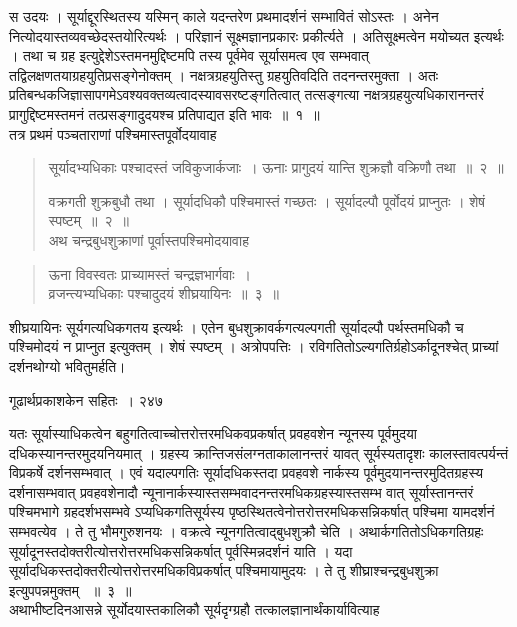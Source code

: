 \documentclass[11pt, openany]{book}
\begin{document}
\noindent स उदयः । सूर्याद्दूरस्थितस्य यस्मिन् काले यदन्तरेण प्रथमादर्शनं सम्भावितं सोऽस्तः । अनेन नित्योदयास्तव्यवच्छेदस्तयोरित्यर्थः । परिज्ञानं सूक्ष्मज्ञानप्रकारः प्रकीर्त्यते । अतिसूक्ष्मत्वेन मयोच्यत इत्यर्थः । तथा च ग्रह इत्युद्देशेऽस्तमनमुद्दिष्टमपि तस्य पूर्वमेव सूर्यासमत्व एव सम्भवात् तद्विलक्षणतयाग्रहयुतिप्रसङ्गेनोक्तम् । नक्षत्रग्रहयुतिस्तु ग्रहयुतिवदिति तदनन्तरमुक्ता । अतः प्रतिबन्धकजिज्ञासापगमेऽवश्यवक्तव्यत्वादस्यावसरष्टङ्गतित्वात् तत्सङ्गत्या नक्षत्रग्रहयुत्यधिकारानन्तरं प्रागुद्दिष्टमस्तमनं तत्प्रसङ्गादुदयश्च प्रतिपाद्यत इति भावः~॥~१~॥\\
\noindent तत्र प्रथमं पञ्चताराणां पश्चिमास्तपूर्वोदयावाह  \textendash


\begin{quote}
{\ssi सूर्यादभ्यधिकाः पश्चादस्तं जविकुजार्कजाः~।
 ऊनाः प्रागुदयं यान्ति शुक्रज्ञौ वक्रिणौ तथा~॥~२~॥~}
\vspace{2mm}

 वक्रगती शुक्रबुधौ तथा । सूर्यादधिकौ पश्चिमास्तं गच्छतः । सूर्यादल्पौ पूर्वोदयं प्राप्नुतः । शेषं स्पष्टम्~॥~२~॥\\
 \noindent अथ चन्द्रबुधशुक्राणां पूर्वास्तपश्चिमोदयावाह \end{quote}

 \begin{quote}
{\ssi  ऊना विवस्वतः प्राच्यामस्तं चन्द्रज्ञभार्गवाः~।\\
व्रजन्त्यभ्यधिकाः पश्चादुदयं शीघ्रयायिनः~॥~३~॥}
\end{quote}
 शीघ्रयायिनः सूर्यगत्यधिकगतय इत्यर्थः । एतेन बुधशुक्रावर्कगत्यल्पगती सूर्यादल्पौ पर्थस्तमधिकौ च पश्चिमोदयं न प्राप्नुत इत्युक्तम् । शेषं स्पष्टम् । अत्रोपपत्तिः । रविगतितोऽल्यगतिर्ग्रहोऽर्कादूनश्चेत् प्राच्यां दर्शनथोग्यो भवितुमर्हति।


\newpage

 \hspace{3cm} गूढार्थप्रकाशकेन सहितः~। \hfill २४७ 
\vspace{1cm}


\noindent यतः सूर्यास्याधिकत्वेन बहुगतित्वाच्चोत्तरोत्तरमधिकवप्रकर्षात् प्रवहवशेन न्यूनस्य पूर्वमुदया दधिकस्यानन्तरमुदयनियमात् । ग्रहस्य क्रान्तिजसंलग्नताकालानन्तरं यावत् सूर्यस्यतादृशः कालस्तावत्पर्यन्तं विप्रकर्षे दर्शनसम्भवात् । एवं यदाल्पगतिः सूर्यादधिकस्तदा प्रवहवशे नार्कस्य पूर्वमुदयानन्तरमुदितग्रहस्य दर्शनासम्भवात् प्रवहवशेनादौ न्यूनानार्कस्यास्तसम्भवादनन्तरमधिकग्रहस्यास्तसम्भ वात् सूर्यास्तानन्तरं पश्चिमभागे ग्रहदर्शभसम्भवे ऽप्यधिकगतिसूर्यस्य पृष्ठस्थितत्वेनोत्तरोत्तरमधिकसन्निकर्षात् पश्चिमा यामदर्शनं सम्भवत्येव । ते तु भौमगुरुशनयः । वक्रत्वे न्यूनगतित्वाद्बुधशुक्रौ चेति । अथार्कगतितोऽधिकगतिग्रहः सूर्यादूनस्तदोक्तरीत्योत्तरोत्तरमधिकसन्निकर्षात् पूर्वस्मिन्नदर्शनं याति । यदा सूर्यादधिकस्तदोक्तरीत्योत्तरोत्तरमधिकविप्रकर्षात् पश्चिमायामुदयः । ते तु शीघ्राश्चन्द्रबुधशुक्रा इत्युपपन्नमुक्तम्~ ॥~३~॥ \\
\noindent अथाभीष्टदिनआसन्ने सूर्योदयास्तकालिकौ सूर्यदृग्ग्रहौ तत्कालज्ञानार्थंकार्यावित्याह \textendash
\end{document}
